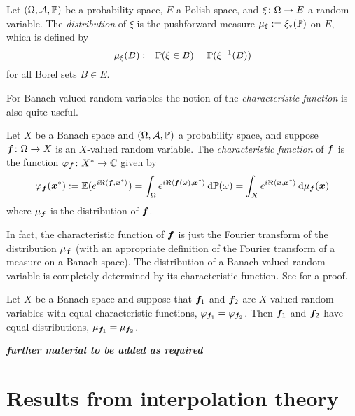 \begin{defn}
  Let $(\Omega,\mc{A},\P)$ be a probability space, $E$ a Polish space, and $\map{\xi}{\Omega}{E}$ a random variable.
  The \emph{distribution} of $\xi$ is the pushforward measure $\mu_{\xi} := \xi_{*}(\P)$ on $E$, which is defined by
  \begin{equation*}
    \mu_{\xi}(B) := \P(\xi \in B) = \P(\xi^{-1}(B))
  \end{equation*}
  for all Borel sets $B \in E$.
\end{defn}

For Banach-valued random variables the notion of the \emph{characteristic function} is also quite useful.

\begin{defn}
  Let $X$ be a Banach space and $(\Omega,\mc{A},\P)$ a probability space, and suppose $\map{\mb{f}}{\Omega}{X}$ is an $X$-valued random variable.
  The \emph{characteristic function} of $\mb{f}$ is the function $\map{\phi_{\mb{f}}}{X^{*}}{\C}$ given by
  \begin{equation*}
    \phi_{\mb{f}}(\mb{x}^{*}) := \E(e^{i\Re\langle \mb{f}, \mb{x}^{*} \rangle}) = \int_{\Omega} e^{i\Re\langle\mb{f}(\omega), \mb{x}^{*} \rangle} \, \dd\P(\omega) = \int_{X} e^{i\Re \langle\mb{x}, \mb{x}^{*} \rangle} \, \dd\mu_{\mb{f}}(\mb{x})
  \end{equation*}
  where $\mu_{\mb{f}}$ is the distribution of $\mb{f}$.
\end{defn}

In fact, the characteristic function of $\mb{f}$ is just the Fourier transform of the distribution $\mu_{\mb{f}}$ (with an appropriate definition of the Fourier transform of a measure on a Banach space).
The distribution of a Banach-valued random variable is completely determined by its characteristic function. See \cite[Corollary E.1.17]{HNVW17} for a proof.

\begin{thm}\label{thm:characteristic-function-uniqueness}
  Let $X$ be a Banach space and suppose that $\mb{f}_{1}$ and $\mb{f}_{2}$ are $X$-valued random variables with equal characteristic functions, $\phi_{\mb{f}_{1}} = \phi_{\mb{f}_{2}}$.
  Then $\mb{f}_{1}$ and $\mb{f}_{2}$ have equal distributions, $\mu_{\mb{f}_{1}} = \mu_{\mb{f}_{2}}$.
\end{thm}

\emph{\textbf{further material to be added as required}}

\section{Results from interpolation theory}


